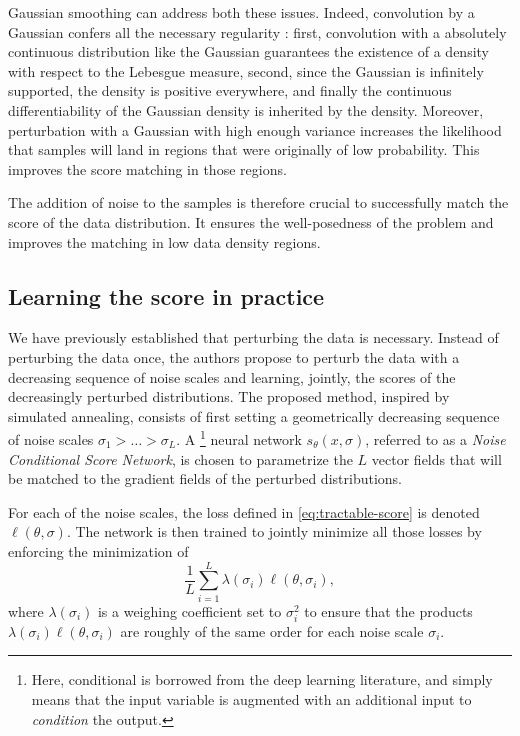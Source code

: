 \documentclass[11pt,twoside]{article}
\theoremstyle{definition}
\begin{document}
Gaussian smoothing can address both these issues. Indeed, convolution by a Gaussian confers all the necessary regularity : first, convolution with a absolutely continuous distribution like the Gaussian guarantees the existence of a density with respect to the Lebesgue measure, second, since the Gaussian is infinitely supported, the density is positive everywhere, and finally the continuous differentiability of the Gaussian density is inherited by the density. Moreover, perturbation with a Gaussian with high enough variance increases the likelihood that samples will land in regions that were originally of low probability. This improves the score matching in those regions.

The addition of noise to the samples is therefore crucial to successfully match the score of the data distribution. It ensures the well-posedness of the problem and improves the matching in low data density regions.

\subsection{Learning the score in practice}

We have previously established that perturbing the data is necessary. Instead of perturbing the data once, the authors propose to perturb the data with a decreasing sequence of noise scales and learning, jointly, the scores of the decreasingly perturbed distributions. The proposed method, inspired by simulated annealing, consists of first setting a geometrically decreasing sequence of noise scales $\sigma_1 > \dots > \sigma_L$. A \footnote{Here, conditional is borrowed from the deep learning literature, and simply means that the input variable is augmented with an additional input to \textit{condition} the output.} neural network $s_\theta(x, \sigma)$, referred to as a \textit{Noise Conditional Score Network}, is chosen to parametrize the $L$  vector fields that will be matched to the gradient fields of the perturbed distributions.

For each of the noise scales, the loss defined in \eqref{eq:tractable-score} is denoted $\ell(\theta, \sigma)$. The network is then trained to jointly minimize all those losses by enforcing the minimization of
\[
\frac{1}{L} \sum_{i=1}^{L}\lambda(\sigma_i) \ell(\theta, \sigma_i),
\]
where $\lambda(\sigma_i)$ is a weighing coefficient set to $\sigma_i^2$ to ensure that the products \(\lambda(\sigma_i) \ell(\theta, \sigma_i)\) are roughly of the same order for each noise scale $\sigma_i$. 
\end{document}
